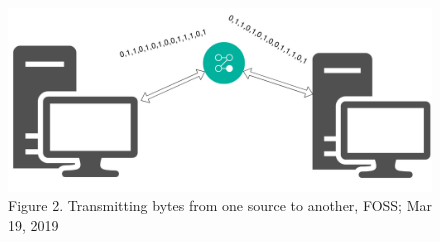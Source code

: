 \documentclass[xcolor=x11names,compress]{beamer}
\renewcommand{\(}{\begin{columns}}
\renewcommand{\)}{\end{columns}}
\newcommand{\<}[1]{\begin{column}{#1}}
\renewcommand{\>}{\end{column}}
\begin{document}

\begin{frame}
    \begin{figure}
        \includegraphics[scale=0.2]{./images/bytes}
        \caption{\tiny  Figure 2. Transmitting bytes from one source to another, FOSS; Mar 19, 2019}
    \end{figure}
\end{frame}
\end{document}
